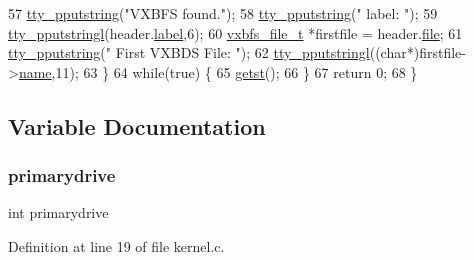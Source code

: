 \begin{DoxyCode}
57         \hyperlink{a00140_ade960b1320324706aac6c00cc6b1b2fe_ade960b1320324706aac6c00cc6b1b2fe}{tty\_pputstring}(\textcolor{stringliteral}{"VXBFS found."});
58         \hyperlink{a00140_ade960b1320324706aac6c00cc6b1b2fe_ade960b1320324706aac6c00cc6b1b2fe}{tty\_pputstring}(\textcolor{stringliteral}{" label: "});
59         \hyperlink{a00140_abaf93f9e56ddb7b10462070f59e534e4_abaf93f9e56ddb7b10462070f59e534e4}{tty\_pputstringl}(header.\hyperlink{a00266_af3cd6b4358b6ba93a7bd541c09c959c8_af3cd6b4358b6ba93a7bd541c09c959c8}{label},6);
60         \hyperlink{a00262}{vxbfs\_file\_t} *firstfile = header.\hyperlink{a00266_a3b903de5c5034494530cdc0c2d4ff9b1_a3b903de5c5034494530cdc0c2d4ff9b1}{file};
61         \hyperlink{a00140_ade960b1320324706aac6c00cc6b1b2fe_ade960b1320324706aac6c00cc6b1b2fe}{tty\_pputstring}(\textcolor{stringliteral}{" First VXBDS File: "});
62         \hyperlink{a00140_abaf93f9e56ddb7b10462070f59e534e4_abaf93f9e56ddb7b10462070f59e534e4}{tty\_pputstringl}((\textcolor{keywordtype}{char}*)firstfile->\hyperlink{a00262_a07ecc9bacdc2943442f26f62f6749055_a07ecc9bacdc2943442f26f62f6749055}{name},11);
63     \}
64     \textcolor{keywordflow}{while}(\textcolor{keyword}{true}) \{
65         \hyperlink{a00029_ab88a2e96bbe585e228a5b201435c0240_ab88a2e96bbe585e228a5b201435c0240}{getst}();
66     \}
67     \textcolor{keywordflow}{return} 0;
68 \}
\end{DoxyCode}


\subsection{Variable Documentation}
\mbox{\label{a00047_af37cb131d8a2101addfbf5fb2d8a53b4_af37cb131d8a2101addfbf5fb2d8a53b4}} 
\subsubsection{\texorpdfstring{primarydrive}{primarydrive}}
{\footnotesize\ttfamily int primarydrive}



Definition at line 19 of file kernel.\+c.

\mbox{\label{a00047_a2125beec541d04796805161dbec05fcf_a2125beec541d04796805161dbec05fcf}} 
